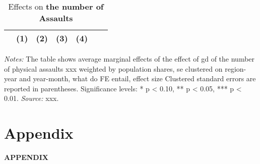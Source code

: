 \documentclass[11pt, a4paper]{article} %
\begin{document}
\vspace*{\fill}\clearpage 
\vspace*{\fill}
\begin{table}[H] \centering 
	\begin{threeparttable} \centering \caption{Effects on \textbf{the number of Assaults}}\label{tab_soc_ext:assaults_poisson_fixed_effects}
		{\def\sym#1{\ifmmode^{#1}\else\(^{#1}\)\fi} 
			\begin{tabular}{l*{6}{c}}
				\toprule 
				&\multicolumn{1}{c}{(1)}&\multicolumn{1}{c}{(2)}&\multicolumn{1}{c}{(3)}&\multicolumn{1}{c}{(4)}\\
				\midrule
				 
				\bottomrule 
		\end{tabular}}
		\begin{tablenotes} 
			\item \scriptsize \emph{Notes:} The table shows average marginal effects of the effect of gd of the number of physical assaults xxx 
			weighted by population shares, se clustered on region-year and year-month, what do FE entail, effect size
			Clustered standard errors are reported in parentheses. \newline Significance levels: * p < 0.10, ** p < 0.05, *** p < 0.01. \newline 	\emph{Source:} xxx.
		\end{tablenotes} 
	\end{threeparttable} 
\end{table}
\vspace*{\fill}\clearpage 




\newpage
\TODO\section{Appendix}
\vspace*{\fill}
{\Huge \begin{center}\textbf{APPENDIX}\end{center}}
\vspace*{\fill}\clearpage


\renewcommand\thefigure{A\arabic{figure}}
\setcounter{figure}{0} 
\captionsetup[subfigure]{labelformat=parens}
\end{document}

